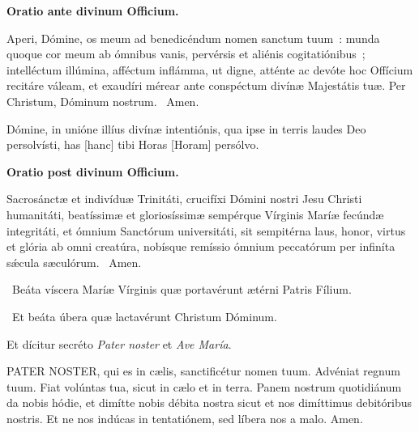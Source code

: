 ﻿%
\mylessonsize
\begin{multicols}{2}%
{
\begin{center}{%
\label{orationes}
\textbf{Oratio ante divinum Officium.}
}\end{center}

	Aperi, Dómine, os meum ad benedicéndum nomen sanctum
tuum~: munda quoque cor meum ab ómnibus vanis, pervérsis et aliénis
cogitatiónibus~; intelléctum illúmina, afféctum inflámma, ut digne, atténte
ac devóte hoc Offícium recitáre váleam, et exaudíri mérear ante
conspéctum divínæ Majestátis tuæ. Per Christum, Dóminum nostrum.
\hfill{}
\Rbar{}~Amen.\null
}

{
Dómine, in unióne illíus divínæ intentiónis, qua ipse in terris
laudes Deo persolvísti, has [hanc] tibi Horas [Horam] persólvo.
}


\mylessonsize
{
\begin{center}{%
\textbf{Oratio post divinum Officium.}
}\end{center}

	Sacrosánctæ et indivíduæ Trinitáti, crucifíxi Dómini nostri Jesu
Christi humanitáti, beatíssimæ et gloriosíssimæ sempérque Vírginis Maríæ
fecúndæ integritáti, et ómnium Sanctórum universitáti, sit sempitérna laus,
honor, virtus et glória ab omni creatúra, nobísque remíssio ómnium
peccatórum per infiníta sǽcula sæculórum.
\hfill{}
\Rbar{}~Amen.\null
}


{
\Vbar{}~Beáta víscera Maríæ Vírginis quæ portavérunt ætérni Patris Fílium.

\Rbar{}~Et beáta úbera quæ lactavérunt Christum Dóminum.


Et dícitur secréto \emph{Pater noster} et \emph{Ave María}.

{PATER NOSTER, qui es in cælis, sanctificétur nomen tuum. Advéniat regnum tuum. Fiat volúntas tua, sicut in cælo et in terra. Panem nostrum quotidiánum da nobis hódie, et dimítte nobis débita nostra sicut et nos dimíttimus debitóribus nostris. Et ne nos indúcas in tentatiónem, sed líbera nos a malo. Amen.

}}
\end{multicols}
